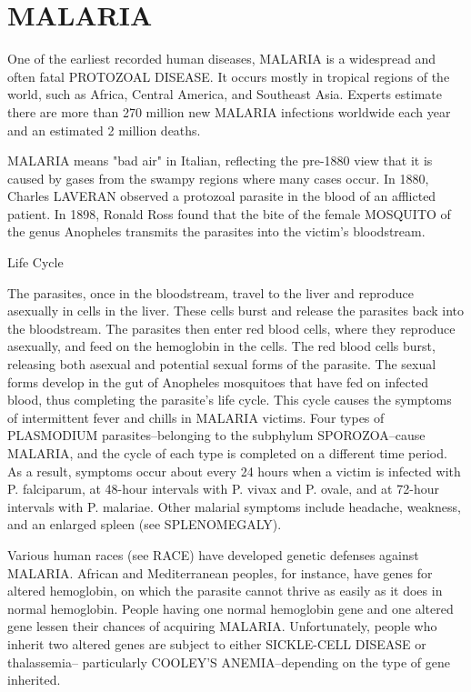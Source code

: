 \setlength{\oddsidemargin}{0in}
\setlength{\evensidemargin}{0in}
\setlength{\textwidth}{6.33in}
\setlength{\topmargin}{0in}
\setlength{\headsep}{0in}
\setlength{\textheight}{8.5in}


\section*{MALARIA}
             
 One of the earliest recorded human diseases, MALARIA is a
widespread and often fatal PROTOZOAL DISEASE.  It
occurs mostly in tropical regions of the world, such as
Africa, Central America, and Southeast Asia.  Experts
estimate there are more than 270 million new MALARIA
infections worldwide each year and an estimated 2
million deaths.

MALARIA means "bad air" in Italian, reflecting the pre-1880 
view that it is caused by gases from the swampy regions where 
many cases occur. In 1880, Charles LAVERAN observed a 
protozoal parasite in the blood of an afflicted patient. In 
1898, Ronald Ross found that the bite of the female MOSQUITO 
of the genus Anopheles transmits the parasites into the 
victim's bloodstream. 

Life Cycle

The parasites, once in the bloodstream, travel to the liver 
and reproduce asexually in cells in the liver.  These cells 
burst and release the parasites back into the bloodstream.  
The parasites then enter red blood cells, where they reproduce 
asexually, and feed on the hemoglobin in the cells.  The red 
blood cells burst, releasing both asexual and potential sexual 
forms of the parasite.  The sexual forms develop in the gut of 
Anopheles mosquitoes that have fed on infected blood, thus 
completing the parasite's life cycle.  This cycle causes the 
symptoms of intermittent fever and chills in MALARIA victims. 
Four types of PLASMODIUM parasites--belonging to the subphylum 
SPOROZOA--cause MALARIA, and the cycle of each type is 
completed on a different time period.  As a result, symptoms 
occur about every 24 hours when a victim is infected with P. 
falciparum, at 48-hour intervals with P. vivax and P. ovale, 
and at 72-hour intervals with P. malariae.  Other malarial 
symptoms include headache, weakness, and an enlarged spleen 
(see SPLENOMEGALY). 

Various human races (see RACE) have developed genetic defenses 
against MALARIA.  African and Mediterranean peoples, for 
instance, have genes for altered hemoglobin, on which the 
parasite cannot thrive as easily as it does in normal 
hemoglobin.  People having one normal hemoglobin gene and one 
altered gene lessen their chances of acquiring MALARIA. 
Unfortunately, people who inherit two altered genes are 
subject to either SICKLE-CELL DISEASE or thalassemia--
particularly COOLEY'S ANEMIA--depending on the type of gene 
inherited. 

